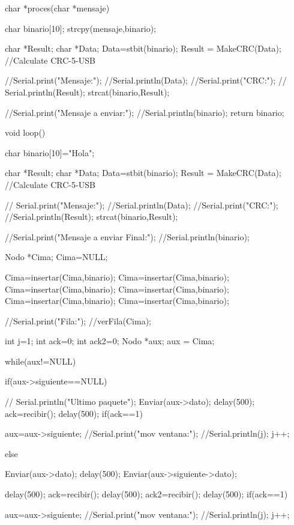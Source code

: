 \documentclass[journal,trans]{IEEEtran}
\begin{document}
\begin{itemize}
char *proces(char *mensaje){
    char binario[10];
     strcpy(mensaje,binario);
 
  
    char  *Result;
    char *Data;
     Data=stbit(binario);                                
   Result = MakeCRC(Data);                     //Calculate CRC-5-USB               

    //Serial.print("Mensaje:");
  //Serial.println(Data); 
  //Serial.print("CRC:");
 // Serial.println(Result);
  strcat(binario,Result);

//Serial.print("Mensaje a enviar:");
  //Serial.println(binario);
  return binario;
  }
   

void loop() {
  char binario[10]={"Hola"};
 
  
    char  *Result;
    char *Data;
     Data=stbit(binario);                                
   Result = MakeCRC(Data);                     //Calculate CRC-5-USB               

   // Serial.print("Mensaje:");
  //Serial.println(Data); 
  //Serial.print("CRC:");
  //Serial.println(Result);
  strcat(binario,Result);

//Serial.print("Mensaje a enviar Final:");
  //Serial.println(binario);
  

Nodo *Cima;
Cima=NULL;

Cima=insertar(Cima,binario);
Cima=insertar(Cima,binario);
Cima=insertar(Cima,binario);
Cima=insertar(Cima,binario);
Cima=insertar(Cima,binario);
Cima=insertar(Cima,binario);

//Serial.print("Fila:");
//verFila(Cima);

int j=1;
int ack=0;
int ack2=0;
 Nodo *aux;
    aux = Cima;
 
    while(aux!=NULL)
    {
   
      if(aux->siguiente==NULL){
       // Serial.println("Ultimo paquete");
        Enviar(aux->dato);
        delay(500);
       ack=recibir();
        delay(500); 
            if(ack==1){
 
              aux=aux->siguiente;
              //Serial.print("mov ventana:");
              //Serial.println(j);
              j++;
       
              }
        }else{
             Enviar(aux->dato);
        delay(500); 
      Enviar(aux->siguiente->dato);
        
        delay(500); 
         ack=recibir();
    delay(500); 
    ack2=recibir();
    delay(500); 
    if(ack==1){
 
              aux=aux->siguiente;
              //Serial.print("mov ventana:");
              //Serial.println(j);
              j++;
      
}}}}
\end{itemize}
\end{document}
